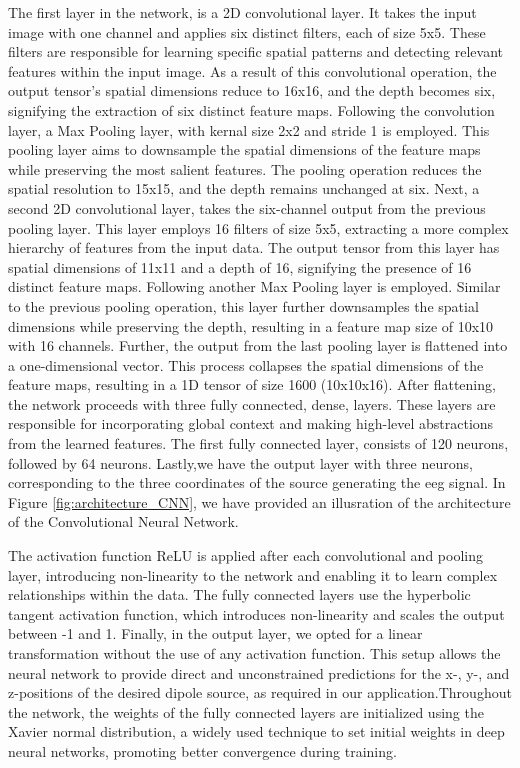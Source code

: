 \documentclass[a4paper, UKenglish, 11pt]{uiomaster}
\begin{document}
The first layer in the network, is a 2D convolutional layer. It takes the input image with one channel and applies six distinct filters, each of size 5x5. These filters are responsible for learning specific spatial patterns and detecting relevant features within the input image. As a result of this convolutional operation, the output tensor's spatial dimensions reduce to 16x16, and the depth becomes six, signifying the extraction of six distinct feature maps. Following the convolution layer, a Max Pooling layer, with kernal size 2x2 and stride 1 is employed. This pooling layer aims to downsample the spatial dimensions of the feature maps while preserving the most salient features. The pooling operation reduces the spatial resolution to 15x15, and the depth remains unchanged at six. Next, a second 2D convolutional layer, takes the six-channel output from the previous pooling layer. This layer employs 16 filters of size 5x5, extracting a more complex hierarchy of features from the input data. The output tensor from this layer has spatial dimensions of 11x11 and a depth of 16, signifying the presence of 16 distinct feature maps. Following another Max Pooling layer is employed. Similar to the previous pooling operation, this layer further downsamples the spatial dimensions while preserving the depth, resulting in a feature map size of 10x10 with 16 channels. Further, the output from the last pooling layer is flattened into a one-dimensional vector. This process collapses the spatial dimensions of the feature maps, resulting in a 1D tensor of size 1600 (10x10x16). After flattening, the network proceeds with three fully connected, dense, layers. These layers are responsible for incorporating global context and making high-level abstractions from the learned features. The first fully connected layer, consists of 120 neurons, followed by 64 neurons. Lastly,we have the output layer with three neurons, corresponding to the three coordinates of the source generating the eeg signal. In Figure \ref{fig:architecture_CNN}, we have provided an illusration of the architecture of the Convolutional Neural Network.

The activation function ReLU is applied after each convolutional and pooling layer, introducing non-linearity to the network and enabling it to learn complex relationships within the data. The fully connected layers use the hyperbolic tangent activation function, which introduces non-linearity and scales the output between -1 and 1. Finally, in the output layer, we opted for a linear transformation without the use of any activation function. This setup allows the neural network to provide direct and unconstrained predictions for the x-, y-, and z-positions of the desired dipole source, as required in our application.Throughout the network, the weights of the fully connected layers are initialized using the Xavier normal distribution, a widely used technique to set initial weights in deep neural networks, promoting better convergence during training.
\end{document}
